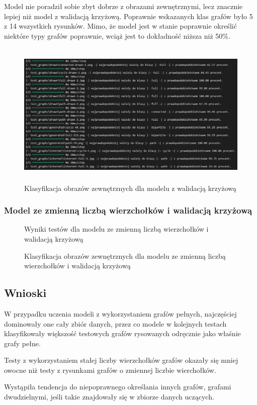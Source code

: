 Model nie poradził sobie zbyt dobrze z obrazami zewnętrznymi, lecz znacznie lepiej niż model z walidacją krzyżową.
Poprawnie wskazanych klas grafów było 5 z 14 wszystkich rysunków.
Mimo, że model jest w stanie poprawnie określić niektóre typy grafów poprawnie,
wciąż jest to dokładność niższa niż 50\%.

\begin{figure}[ht]
	\centering
	\includegraphics[height=7cm]{partials/images/tests/v2_multiple_edges_epoch75_img_tests.png}
	\caption{Klasyfikacja obrazów zewnętrznych dla modelu z walidacją krzyżową}
\label{Fig:GraphUndirected}
\end{figure}
\FloatBarrier

\subsubsection{Model ze zmienną liczbą wierzchołków i walidacją krzyżową}

\begin{figure}[ht]
	\centering
	\caption{Wyniki testów dla modelu ze zmienną liczbą wierzchołków i walidacją krzyżową}
\label{Fig:GraphUndirected}
\end{figure}
\FloatBarrier

\begin{figure}[ht]
	\centering
	\caption{Klasyfikacja obrazów zewnętrznych dla modelu ze zmienną liczbą wierzchołków i walidacją krzyżową}
\label{Fig:GraphUndirected}
\end{figure}
\FloatBarrier

\subsection{Wnioski}
W przypadku uczenia modeli z wykorzystaniem grafów pełnych, najczęściej dominowały one cały zbiór danych,
przez co modele w kolejnych testach klasyfikowały większość testowych grafów rysowanych odręcznie jako właśnie grafy pełne.

Testy z wykorzystaniem stałej liczby wierzchołków grafów okazały się mniej owocne niż testy z rysunkami grafów
o zmiennej liczbie wierchołków.

Wystąpiła tendencja do niepoprawnego określania innych grafów, grafami dwudzielnymi, jeśli takie znajdowały się
w zbiorze danych uczących.